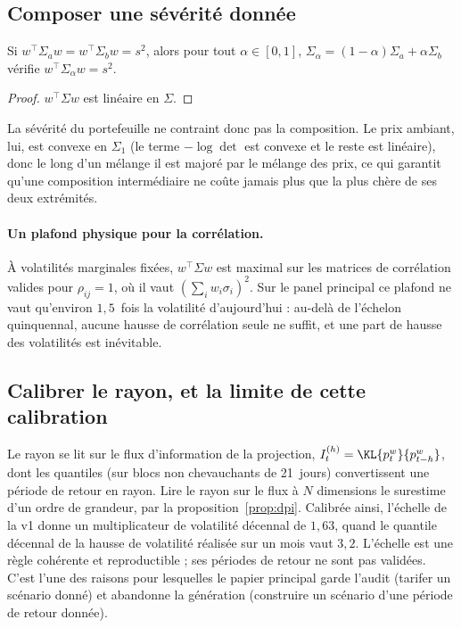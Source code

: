 \subsection{Composer une sévérité donnée}

\begin{proposition}
\label{prop:composition}
Si $w^\top\Sigma_aw=w^\top\Sigma_bw=s^2$, alors pour tout $\alpha\in[0,1]$,
$\Sigma_\alpha=(1-\alpha)\Sigma_a+\alpha\Sigma_b$ vérifie
$w^\top\Sigma_\alpha w=s^2$.
\end{proposition}

\begin{proof}
$w^\top\Sigma w$ est linéaire en $\Sigma$.
\end{proof}

La sévérité du portefeuille ne contraint donc pas la composition. Le prix
ambiant, lui, est convexe en $\Sigma_1$ (le terme $-\log\det$ est convexe et le
reste est linéaire), donc le long d'un mélange il est majoré par le mélange des
prix, ce qui garantit qu'une composition intermédiaire ne coûte jamais plus que
la plus chère de ses deux extrémités.

\paragraph{Un plafond physique pour la corrélation.} À volatilités marginales
fixées, $w^\top\Sigma w$ est maximal sur les matrices de corrélation valides pour
$\rho_{ij}=1$, où il vaut $(\sum_iw_i\sigma_i)^2$. Sur le panel principal ce
plafond ne vaut qu'environ $1{,}5$~fois la volatilité d'aujourd'hui : au-delà de
l'échelon quinquennal, aucune hausse de corrélation seule ne suffit, et une part
de hausse des volatilités est inévitable.

\subsection{Calibrer le rayon, et la limite de cette calibration}

Le rayon se lit sur le flux d'information de la projection,
$I^{(h)}_t=\KL{p^w_t}{p^w_{t-h}}$, dont les quantiles (sur blocs non
chevauchants de 21~jours) convertissent une période de retour en rayon. Lire le
rayon sur le flux à $N$ dimensions le surestime d'un ordre de grandeur, par la
proposition~\ref{prop:dpi}. Calibrée ainsi, l'échelle de la v1 donne un
multiplicateur de volatilité décennal de $1{,}63$, quand le quantile décennal de
la hausse de volatilité réalisée sur un mois vaut $3{,}2$. L'échelle est une
règle cohérente et reproductible ; ses périodes de retour ne sont pas validées.
C'est l'une des raisons pour lesquelles le papier principal garde l'audit
(tarifer un scénario donné) et abandonne la génération (construire un scénario
d'une période de retour donnée).


